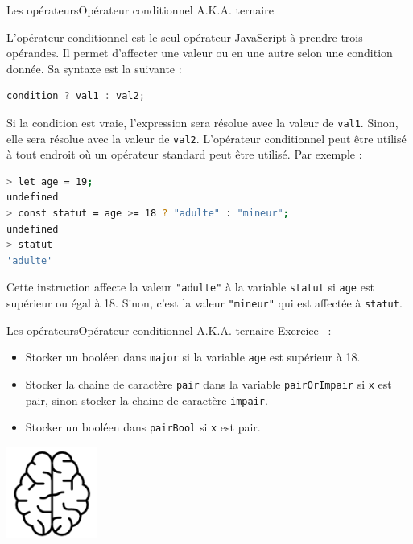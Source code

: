 \documentclass{beamer}
\begin{document}
    \begin{frame}[fragile]{Les opérateurs}{Opérateur conditionnel A.K.A. ternaire}
        \begin{small}
            L'opérateur conditionnel est le seul opérateur JavaScript à prendre trois opérandes. Il permet d'affecter une valeur ou en une autre selon une condition donnée. Sa syntaxe est la suivante :
            \begin{lstlisting}[language=JavaScript]
condition ? val1 : val2;
            \end{lstlisting}
            Si la condition est vraie, l'expression sera résolue avec la valeur de \lstinline{val1}.
            Sinon, elle sera résolue avec la valeur de \lstinline{val2}.
            L'opérateur conditionnel peut être utilisé à tout endroit où un opérateur standard peut être utilisé.
            \bigbreak
            Par exemple :
            \begin{lstlisting}[language=Bash]
> let age = 19;
undefined
> const statut = age >= 18 ? "adulte" : "mineur";
undefined
> statut
'adulte'
            \end{lstlisting}
            Cette instruction affecte la valeur \lstinline{"adulte"} à la variable \lstinline{statut} si \lstinline{age} est supérieur ou égal à 18. Sinon, c'est la valeur \lstinline{"mineur"} qui est affectée à \lstinline{statut}.
        \end{small}
    \end{frame}

    \begin{frame}{Les opérateurs}{Opérateur conditionnel A.K.A. ternaire}
        Exercice \execcounterdispinc{}~:
        \begin{itemize}
            \item Stocker un booléen dans \lstinline{major} si la variable \lstinline{age} est supérieur à 18.
            \item Stocker la chaine de caractère \lstinline{pair} dans la variable \lstinline{pairOrImpair} si \lstinline{x} est pair, sinon stocker la chaine de caractère \lstinline{impair}.
            \item Stocker un booléen dans \lstinline{pairBool} si \lstinline{x} est pair.
        \end{itemize}
        \bigbreak
        \centering
        \includegraphics[width=3cm]{image/intelligence}
    \end{frame}
\end{document}
